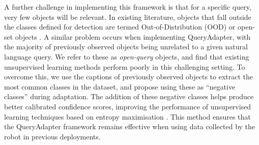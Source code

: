 A further challenge in implementing this framework is that for a specific query, very few objects will be relevant. In existing literature, objects that fall outside the classes defined for detection are termed Out-of-Distribution (OOD) \cite{ueo} or open-set objects \cite{open_vlm}. A similar problem occurs when implementing QueryAdapter, with the majority of previously observed objects being unrelated to a given natural language query. 
We refer to these as \textit{open-query} objects, and find that existing unsupervised learning methods perform poorly in this challenging setting.
To overcome this, we use the captions of previously observed objects to extract the most common classes in the dataset, and propose using these as ``negative classes'' during adaptation.
The addition of these negative classes helps produce better calibrated confidence scores, improving the performance of unsupervised learning techniques based on entropy maximisation \cite{ueo}. This method ensures that the QueryAdapter framework remains effective when using data collected by the robot in previous deployments.

